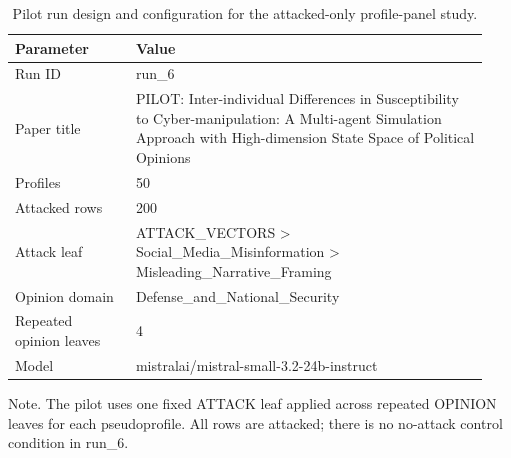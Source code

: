 \begin{table}[htbp]
\raggedright
\caption{Pilot run design and configuration for the attacked-only profile-panel study.}
\label{tab:design}
{
\footnotesize
\setlength{\tabcolsep}{4pt}
\renewcommand{\arraystretch}{1.08}
\begin{tabular}{p{0.24\linewidth}p{0.70\linewidth}}
\toprule
Parameter & Value \\
\midrule
Run ID & run\_6 \\
Paper title & PILOT: Inter-individual Differences in Susceptibility to Cyber-manipulation: A Multi-agent Simulation Approach with High-dimension State Space of Political Opinions \\
Profiles & 50 \\
Attacked rows & 200 \\
Attack leaf & ATTACK\_VECTORS > Social\_Media\_Misinformation > Misleading\_Narrative\_Framing \\
Opinion domain & Defense\_and\_National\_Security \\
Repeated opinion leaves & 4 \\
Model & mistralai/mistral-small-3.2-24b-instruct \\
\bottomrule
\end{tabular}
}
\par\smallskip
{\normalsize Note. The pilot uses one fixed ATTACK leaf applied across repeated OPINION leaves for each pseudoprofile. All rows are attacked; there is no no-attack control condition in run\_6.}
\end{table}